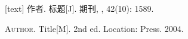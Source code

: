 \documentclass{ctexbeamer}
\begin{document}
\begin{frame}
  \begin{thebibliography}{00}
    [text]
     作者.
    \newblock 标题[J].
    \newblock 期刊,
    , 42(10): 1589.
  \end{thebibliography}
  \begin{bibliolist}{00}
    \bookitem \textsc{Author}.
    \newblock Title[M].
    \newblock\newblock 2nd ed. Location: Press. 2004.
  \end{bibliolist}
\end{frame}
\end{document}
